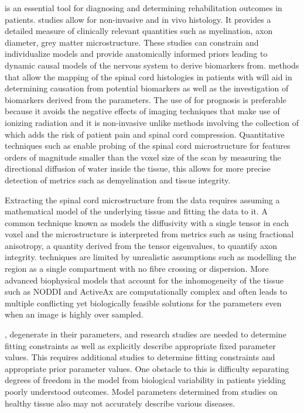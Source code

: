 \mri is an essential tool for diagnosing and determining rehabilitation outcomes in \sci patients. %
%
\mri studies allow for non-invasive and in vivo histology. It provides a detailed measure of clinically relevant quantities such as myelination, axon diameter, grey matter microstructure. These studies can constrain and individualize models and provide anatomically informed priors leading to dynamic causal models of the nervous system to derive biomarkers from. \cite{freund2016embodied}%
%
\mri methods that allow the mapping of the spinal cord histologies in patients with \sci will aid in determining causation from potential biomarkers as well as the investigation of biomarkers derived from the \mri parameters. \cite{freund2016embodied}
\fi
%
The use of \mri for prognosis is preferable because it avoids the negative effects of imaging techniques that make use of ionizing radiation and it is non-invasive unlike methods involving the collection of \csf which adds the risk of patient pain and spinal cord compression. \cite{hrishi2019cerebrospinal} Quantitative \mri techniques such as \dmri enable probing of the spinal cord microstructure for features orders of magnitude smaller than the voxel size of the \mri scan by measuring the directional diffusion of water inside the tissue, this allows for more precise detection of metrics such as demyelination and tissue integrity. \cite{cohen2018microstructural, cadotte2018has, freund2013mri, seif2018quantitative}

Extracting the spinal cord microstructure from the \dmri data requires assuming a mathematical model of the underlying tissue and fitting the data to it. A common technique known as \dti models the diffusivity with a single tensor in each voxel and the microstructure is interpreted from \dti metrics such as using fractional anisotropy, a quantity derived from the tensor eigenvalues, to quantify axon integrity. \dti techniques are limited by unrealistic assumptions such as modelling the region as a single compartment with no fibre crossing or dispersion. \cite{vedantam2014diffusion} More advanced biophysical models that account for the inhomogeneity of the tissue such as NODDI and ActiveAx are computationally complex and often leads to multiple conflicting yet biologically feasible solutions for the parameters even when an image is highly over sampled. \cite{jelescu2016degeneracy}

%
, degenerate in their parameters, and research studies are needed to determine fitting constraints as well as explicitly describe appropriate fixed parameter values.
\fi
%
This requires additional studies to determine fitting constraints and appropriate prior parameter values.
One obstacle to this is difficulty separating degrees of freedom in the model from biological variability in patients yielding poorly understood outcomes. \cite{novikov2018modeling} Model parameters determined from studies on healthy tissue also may not accurately describe various diseases.

